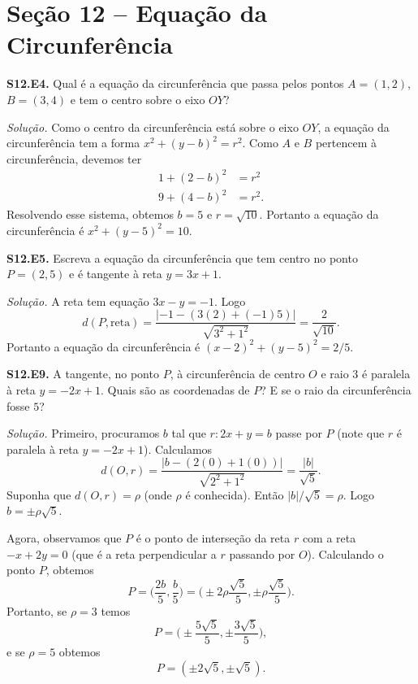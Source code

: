 \documentclass[a4paper,11pt]{article}
\begin{document}
\section*{Seção 12 -- Equação da Circunferência}

\textbf{S12.E4.}
Qual é a equação da circunferência que passa pelos pontos $A = (1,2)$, $B = (3,4)$ e tem o centro sobre o eixo $OY$?

\vspace{\baselineskip}

\emph{Solução.}
Como o centro da circunferência está sobre o eixo $OY$, a equação da circunferência tem a forma $x^2 + (y-b)^2 = r^2$.
Como $A$ e $B$ pertencem à circunferência, devemos ter
\begin{align*}
  1 + (2 - b)^2 & = r^2 \\
  9 + (4 - b)^2 & = r^2.
\end{align*}
Resolvendo esse sistema, obtemos $b = 5$ e $r = \sqrt{10}$.
Portanto a equação da circunferência é $x^2 + (y - 5)^2 = 10$.

\vspace{\baselineskip}

\textbf{S12.E5.}
Escreva a equação da circunferência que tem centro no ponto $P = (2,5)$ e é tangente à reta $y = 3x + 1$.

\vspace{\baselineskip}

\emph{Solução.}
A reta tem equação $3x - y = -1$.
Logo
\[
  d(P,\mathrm{reta}) = \frac{|-1-(3(2) + (-1)5)|}{\sqrt{3^2 + 1^2}} = \frac{2}{\sqrt{10}}.
\]
Portanto a equação da circunferência é $(x-2)^2 + (y-5)^2 = 2/5$.

\vspace{\baselineskip}

\textbf{S12.E9.}
A tangente, no ponto $P$, à circunferência de centro $O$ e raio $3$ é paralela à reta $y = -2x + 1$.
Quais são as coordenadas de $P$?
E se o raio da circunferência fosse $5$?

\vspace{\baselineskip}

\emph{Solução.}
Primeiro, procuramos $b$ tal que $r: 2x + y = b$ passe por $P$ (note que $r$ é paralela à reta $y = -2x + 1$).
Calculamos
\[
  d(O,r) = \frac{|b - (2(0) + 1(0))|}{\sqrt{2^2 + 1^2}} = \frac{|b|}{\sqrt{5}}.
\]
Suponha que $d(O,r) = \rho$ (onde $\rho$ é conhecida).
Então $|b|/\sqrt{5} = \rho$.
Logo $b = \pm \rho \sqrt{5}$.

Agora, observamos que $P$ é o ponto de interseção da reta $r$ com a reta $-x + 2y = 0$ (que é a reta perpendicular a $r$ passando por $O$).
Calculando o ponto $P$, obtemos
\[
  P = \Big( \frac{2b}{5}, \frac{b}{5} \Big) = \Big( \pm 2\rho \frac{\sqrt{5}}{5}, \pm \rho \frac{\sqrt{5}}{5} \Big).
\]
Portanto, se $\rho = 3$ temos
\[
  P = \Big( \pm \frac{5 \sqrt{5}}{5}, \pm \frac{3\sqrt{5}}{5} \Big),
\]
e se $\rho = 5$ obtemos
\[
  P = ( \pm 2\sqrt{5}, \pm \sqrt{5}).
\]
\end{document}
